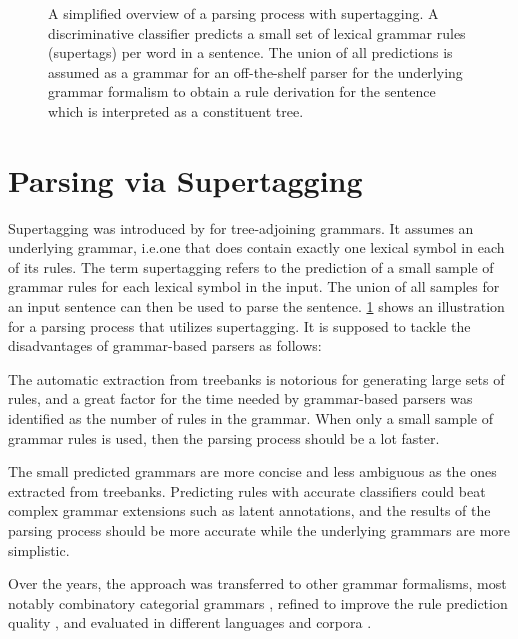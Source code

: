 \documentclass[../document.tex]{subfiles}
\begin{document}
    \begin{figure}
        \resizebox{\linewidth}{!}{}
        \caption{\label{fig:supertagging}
            A simplified overview of a parsing process with supertagging.
            A discriminative classifier predicts a small set of lexical grammar rules (supertags) per word in a sentence.
            The union of all predictions is assumed as a grammar for an off-the-shelf parser for the underlying grammar formalism to obtain a rule derivation for the sentence which is interpreted as a constituent tree.
        }
    \end{figure}
    
    \section*{Parsing via Supertagging}
    Supertagging was introduced by \citet{bangalore1999supertagging} for tree-adjoining grammars.
    It assumes an underlying  grammar, i.e.\@ one that does contain exactly one lexical symbol in each of its rules.
    The term supertagging refers to the prediction of a small sample of grammar rules for each lexical symbol in the input.
    The union of all samples for an input sentence can then be used to parse the sentence.
    \cref{fig:supertagging} shows an illustration for a parsing process that utilizes supertagging.
    It is supposed to tackle the disadvantages of grammar-based parsers as follows:
    \begin{compactitem}
        \item The automatic extraction from treebanks is notorious for generating large sets of rules, and a great factor for the time needed by grammar-based parsers was identified as the number of rules in the grammar. \cite{dunlop2010reducing}
            When only a small sample of grammar rules is used, then the parsing process should be a lot faster.
        \item The small predicted grammars are more concise and less ambiguous as the ones extracted from treebanks.
            Predicting rules with accurate classifiers could beat complex grammar extensions such as latent annotations, and the results of the parsing process should be more accurate while the underlying grammars are more simplistic.
    \end{compactitem}
    Over the years, the approach was transferred to other grammar formalisms, most notably combinatory categorial grammars \citep{Clark04}, refined to improve the rule prediction quality \citep{vaswani2016supertagging,Kad18,tian20}, and evaluated in different languages and corpora \citep{Bla18}.
\end{document}
